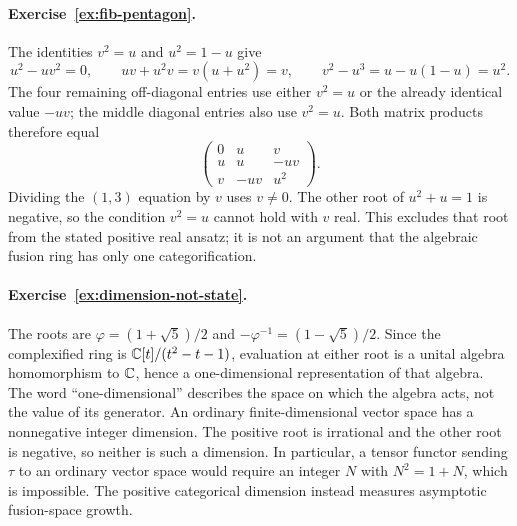 \paragraph{Exercise~\ref{ex:fib-pentagon}.}
\label{sol:ex:fib-pentagon}
The identities $v^2=u$ and $u^2=1-u$ give
\[
 u^2-uv^2=0,\qquad uv+u^2v=v(u+u^2)=v,
 \qquad v^2-u^3=u-u(1-u)=u^2.
\]
The four remaining off-diagonal entries use either $v^2=u$ or
the already identical value $-uv$; the middle diagonal entries
also use $v^2=u$. Both matrix products therefore equal
\[
 \begin{pmatrix}0&u&v\\u&u&-uv\\v&-uv&u^2\end{pmatrix}.
\]
Dividing the $(1,3)$ equation by $v$
uses $v\ne0$.  The other root of $u^2+u=1$ is negative, so the
condition $v^2=u$ cannot hold with $v$ real.  This excludes that
root from the stated positive real ansatz; it is not an argument
that the algebraic fusion ring has only one categorification.



\paragraph{Exercise~\ref{ex:dimension-not-state}.}
\label{sol:ex:dimension-not-state}
The roots are $\varphi=(1+\sqrt5)/2$ and
$-\varphi^{-1}=(1-\sqrt5)/2$. Since the complexified ring is
$\mathbb C[t]/(t^2-t-1)$, evaluation at either root is a unital algebra
homomorphism to $\mathbb C$, hence a one-dimensional representation of
that algebra. The word ``one-dimensional'' describes the space
on which the algebra acts, not the value of its generator.
An ordinary finite-dimensional vector space has a nonnegative
integer dimension. The positive root is irrational and the other
root is negative, so neither is such a dimension. In particular,
a tensor functor sending $\tau$ to an ordinary vector space would
require an integer $N$ with $N^2=1+N$, which is impossible.
The positive categorical dimension instead measures asymptotic
fusion-space growth.


